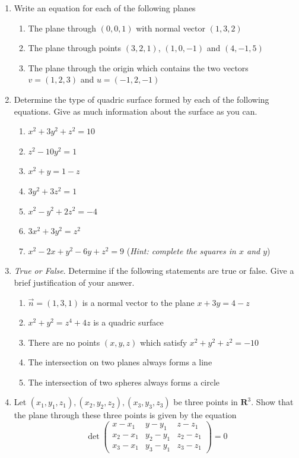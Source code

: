 \documentclass[12pt]{article}
\numberwithin{equation}{subsection}
\numberwithin{figure}{subsection}
\theoremstyle{note}
\begin{document}
{\begin{enumerate}[label=\arabic*.]
	\item Write an equation for each of the following planes
	\begin{enumerate}
		\item The plane through $(0,0,1)$ with normal vector $(1,3,2)$
		\item The plane through points $(3,2,1)$, $(1,0,-1)$ and $(4,-1,5)$
		\item The plane through the origin which contains the two vectors $v=(1,2,3)$ and $u=(-1,2,-1)$
	\end{enumerate}	
	
	
	\item Determine the type of quadric surface formed by each of the following equations. Give as much information about the surface as you can.
	\begin{enumerate}
		\item $x^2+3y^2+z^2=10$
		\item $z^2-10y^2=1$
		\item $x^2+y=1-z$
		\item $3y^2+3z^2=1$
		\item $x^2-y^2+2z^2=-4$
		\item $3x^2+3y^2=z^2$
		\item $x^2-2x+y^2-6y+z^2=9$ \quad (\textit{Hint: complete the squares in $x$ and $y$})
	\end{enumerate}

	\item \textit{True or False}. Determine if the following statements are true or false. Give a brief justification of your answer.
	\begin{enumerate}
		\item  $\vec{n}=(1,3,1)$ is a normal vector to the plane $x+3y=4-z$\
		\item $x^2+y^2=z^4+4z$ is a quadric surface
		\item There are no points $(x,y,z)$ which satisfy $x^2+y^2+z^2=-10$
		\item The intersection on two planes always forms a line
		\item The intersection of two spheres always forms a circle
	\end{enumerate}
	
	\item Let $(x_1,y_1,z_1), (x_2, y_2, z_2), (x_3, y_3, z_3)$ be three points in $\mathbf{R}^3$. Show that the plane through these three points is given by the equation \[ \det \begin{pmatrix} x-x_1 & y-y_1 & z-z_1 \\ x_2-x_1 & y_2-y_1 & z_2-z_1 \\ x_3-x_1 & y_3-y_1 & z_3-z_1\end{pmatrix} = 0 \]
\end{enumerate}



}
\end{document}
